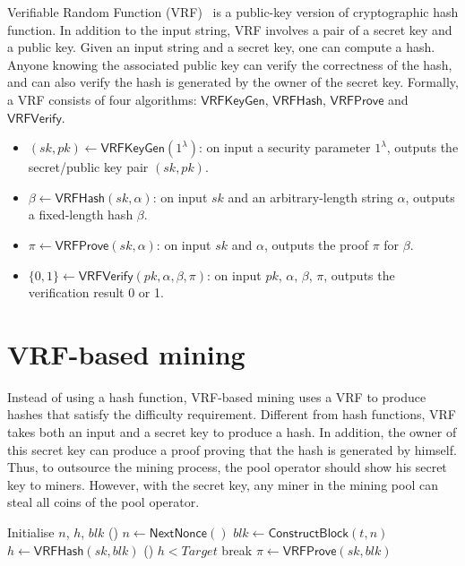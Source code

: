 \documentclass[sigconf]{acmart}
\begin{document}
Verifiable Random Function (VRF)~\cite{micali1999verifiable} is a public-key version of cryptographic hash function.
In addition to the input string, VRF involves a pair of a secret key and a public key.
Given an input string and a secret key, one can compute a hash.
Anyone knowing the associated public key can verify the correctness of the hash, and can also verify the hash is generated by the owner of the secret key.
Formally, a VRF consists of four algorithms: $\mathsf{VRFKeyGen}$, $\mathsf{VRFHash}$, $\mathsf{VRFProve}$ and $\mathsf{VRFVerify}$.

\begin{itemize}
    \item $(sk, pk) \gets \mathsf{VRFKeyGen}(1^{\lambda})$: on input a security parameter $1^{\lambda}$, outputs the secret/public key pair $(sk, pk)$.
    \item $\beta \gets \mathsf{VRFHash}(sk, \alpha)$: on input $sk$ and an arbitrary-length string $\alpha$, outputs a fixed-length hash $\beta$.
    \item $\pi \gets \mathsf{VRFProve}(sk, \alpha)$: on input $sk$ and $\alpha$, outputs the proof $\pi$ for $\beta$.
    \item $\{0, 1\} \gets \mathsf{VRFVerify}(pk, \alpha, \beta, \pi)$: on input $pk$, $\alpha$, $\beta$, $\pi$, outputs the verification result 0 or 1.
\end{itemize}

\section{VRF-based mining}
\label{sec:construction}

Instead of using a hash function, VRF-based mining uses a VRF to produce hashes that satisfy the difficulty requirement.
Different from hash functions, VRF takes both an input and a secret key to produce a hash.
In addition, the owner of this secret key can produce a proof proving that the hash is generated by himself.
Thus, to outsource the mining process, the pool operator should show his secret key to miners.
However, with the secret key, any miner in the mining pool can steal all coins of the pool operator.

\begin{algorithm}[]
\caption{$\mathsf{Work}(sk, t, Target)$.}
\label{algo:work}
\SetAlgoLined\DontPrintSemicolon
{}
  Initialise $n$, $h$, $blk$ 
  \While () {$n \gets \mathsf{NextNonce}()$}{
    $blk \gets \mathsf{ConstructBlock}(t, n)$ 
    $h \gets \mathsf{VRFHash}(sk, blk)$ 
    \If () {$h < Target$}{
      break 
    }
  }
  $\pi \gets \mathsf{VRFProve}(sk, blk)$ 
   
\end{algorithm}
\end{document}
